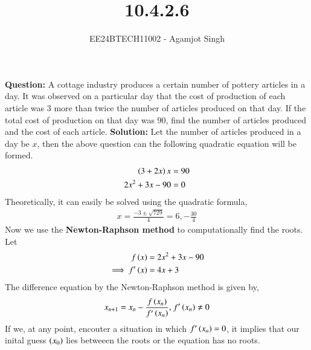 \documentclass[journal]{IEEEtran}
\begin{document}

\vspace{3cm}

\title{10.4.2.6}
\author{EE24BTECH11002 - Agamjot Singh}
{\let\newpage\relax\maketitle}

\renewcommand{\thefigure}{\theenumi}
\renewcommand{\thetable}{\theenumi}
\setlength{\intextsep}{10pt} %

\textbf{Question:}
\newline
A cottage industry produces a certain number of pottery articles in a day. It was observed on a particular day that the cost of production of each article  was $3$ more than twice the number of articles produced on that day. If the total cost of production on that day was $90$, find the number of articles produced and the cost of each article.
\newline
\textbf{Solution:}
\newline
Let the number of articles produced in a day be $x$, then the above question can the following quadratic equation will be formed.
\begin{align}
    \left(3 + 2x\right)x &= 90\\
    2x^2 + 3x - 90 &= 0
\end{align}
Theoretically, it can easily be solved using the quadratic formula,
\begin{align}
    x = \frac{-3 \pm \sqrt{729}}{4} = 6, -\frac{30}{4}
\end{align}
Now we use the \textbf{Newton-Raphson method} to computationally find the roots.
\newline
Let 
\begin{align}
    f\left(x\right) &= 2x^2 + 3x - 90\\
    \implies f^{\prime}\left(x\right) &= 4x + 3
\end{align}
The difference equation by the Newton-Raphson method is given by,
\begin{align}
    x_{n + 1} = x_n - \frac{f\left(x_n\right)}{f^{\prime}\left(x_n\right)} \text{, } f^{\prime}\left(x_n\right) \neq 0
\end{align}
If we, at any point, encouter a situation in which $f^{\prime}\left(x_n\right) = 0$, it implies that our inital guess $\left(x_0\right)$ lies betweeen the roots or the equation has no roots.
\end{document}
